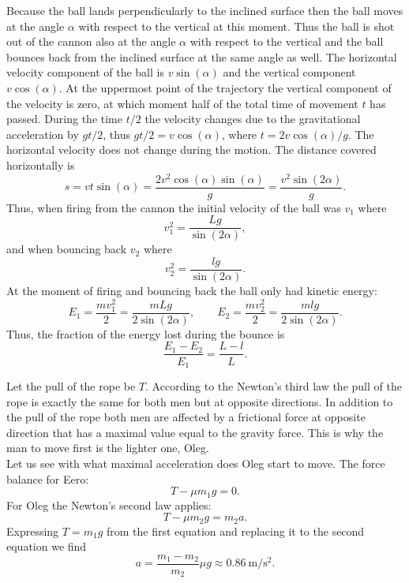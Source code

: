 \documentclass[11pt]{article}
\begin{document}
\solueng
Because the ball lands perpendicularly to the inclined surface then the ball moves at the angle $\alpha$ with respect to the vertical at this moment. Thus the ball is shot out of the cannon also at the angle $\alpha$ with respect to the vertical and the ball bounces back from the inclined surface at the same angle as well. The horizontal velocity component of the ball is $v\sin(\alpha)$ and the vertical component $v\cos(\alpha)$. At the uppermost point of the trajectory the vertical component of the velocity is zero, at which moment half of the total time of movement $t$ has passed. During the time $t/2$ the velocity changes due to the gravitational acceleration by $gt/2$, thus $gt/2 =v\cos(\alpha)$, where $t=2v\cos(\alpha)/g$. The horizontal velocity does not change during the motion. The distance covered horizontally is
$$s=vt\sin(\alpha)=\frac{2v^2\cos(\alpha)\sin(\alpha)}{g} = \frac{v^2\sin(2\alpha)}{g}.$$ 
Thus, when firing from the cannon the initial velocity of the ball was $v_1$ where
\[ v_1^2 = \frac{Lg}{\sin(2\alpha)}, \] 
and when bouncing back $v_2$ where
\[ v_2^2 = \frac{lg}{\sin(2\alpha)}. \] 
At the moment of firing and bouncing back the ball only had kinetic energy:
\[ E_1 = \frac{mv_1^2}{2}=\frac{mLg}{2\sin(2\alpha)},\quad\quad E_2 =\frac{mv_2^2}{2} = \frac{mlg}{2\sin(2\alpha)}. \]
Thus, the fraction of the energy lost during the bounce is
\[ \frac{E_1-E_2}{E_1} = \frac{L-l}{L}. \]
\probend
\bigskip


\solueng
Let the pull of the rope be $T$. According to the Newton’s third law the pull of the rope is exactly the same for both men but at opposite directions. In addition to the pull of the rope both men are affected by a frictional force at opposite direction that has a maximal value equal to the gravity force. This is why the man to move first is the lighter one, Oleg.\\
Let us see with what maximal acceleration does Oleg start to move. The force balance for Eero:
\[
T-\mu m_1g = 0.
\]
For Oleg the Newton’s second law applies:
\[
T-\mu m_2g = m_2a.
\]
Expressing $T=m_1g$ from the first equation and replacing it to the second equation we find
\[
a = \frac{m_1-m_2}{m_2}\mu g \approx \SI{0,86}{\meter \per \second\squared}.
\]
\probend
\bigskip

\end{document}
